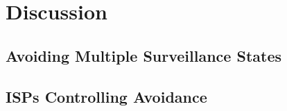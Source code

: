 \section{Discussion}
\label{discussion}

\subsection{Avoiding Multiple Surveillance States}

\subsection{ISPs Controlling Avoidance}
